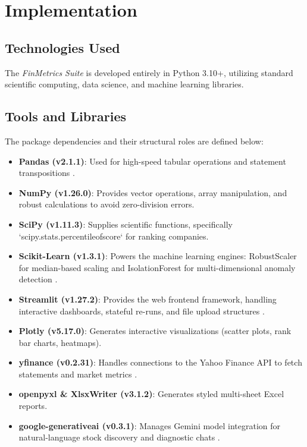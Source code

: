 \chapter{Implementation}
\label{ch:implementation}

\section{Technologies Used}
The \textit{FinMetrics Suite} is developed entirely in Python 3.10+, utilizing standard scientific computing, data science, and machine learning libraries.

\section{Tools and Libraries}
The package dependencies and their structural roles are defined below:
\begin{itemize}
    \item \textbf{Pandas (v2.1.1)}: Used for high-speed tabular operations and statement transpositions \cite{mckinney2012python}.
    \item \textbf{NumPy (v1.26.0)}: Provides vector operations, array manipulation, and robust calculations to avoid zero-division errors.
    \item \textbf{SciPy (v1.11.3)}: Supplies scientific functions, specifically `scipy.stats.percentileofscore` for ranking companies.
    \item \textbf{Scikit-Learn (v1.3.1)}: Powers the machine learning engines: RobustScaler for median-based scaling and IsolationForest for multi-dimensional anomaly detection \cite{scikit-learn}.
    \item \textbf{Streamlit (v1.27.2)}: Provides the web frontend framework, handling interactive dashboards, stateful re-runs, and file upload structures \cite{streamlit}.
    \item \textbf{Plotly (v5.17.0)}: Generates interactive visualizations (scatter plots, rank bar charts, heatmaps).
    \item \textbf{yfinance (v0.2.31)}: Handles connections to the Yahoo Finance API to fetch statements and market metrics \cite{yfinance}.
    \item \textbf{openpyxl \& XlsxWriter (v3.1.2)}: Generates styled multi-sheet Excel reports.
    \item \textbf{google-generativeai (v0.3.1)}: Manages Gemini model integration for natural-language stock discovery and diagnostic chats \cite{gemini2023}.
\end{itemize}

